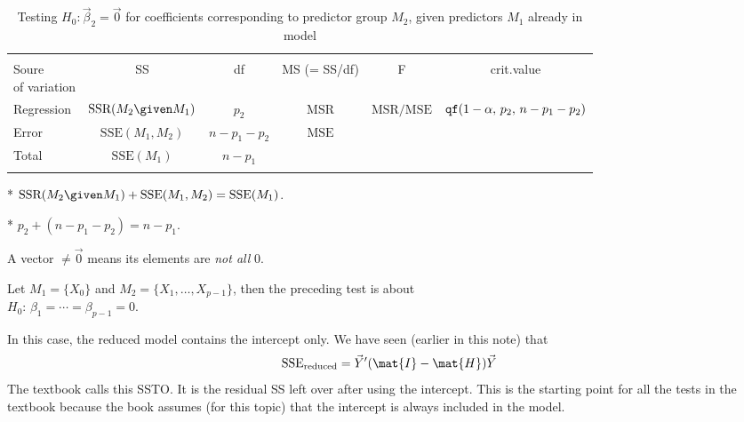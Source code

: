\documentclass[12pt]{article}
\newcommand\SSE{\text{SSE}}
\newcommand\SSR{\text{SSR}}
\newcommand\MSE{\text{MSE}}
\newcommand\MSR{\text{MSR}}
\begin{document}
\begin{table}
\caption{Testing $H_0: \vec{\beta}_2 = \vec{0}$
for coefficients corresponding to predictor group $M_2$,
given predictors $M_1$ already in model}
\label{tab:anova-general}
\vskip5pt
\footnotesize
\begin{tabular}{lccccc}
\hline\\[-4pt]
\shortstack[l]{Soure\\ of variation}
    & SS & df & MS (= SS/df) & F & crit.\@ value\\
        \tabvskip{2pt} \hline \tabvskip{2pt}
Regression
    & $\SSR(M_2 \given M_1)$
        & $p_2$
            & $\MSR$
                & $\MSR / \MSE$
                    & $\text{\tt qf}(1 - \alpha,\, p_2,\, n - p_1 - p_2)$\\
Error
    & $\SSE(M_1, M_2)$
        & $n - p_1 - p_2$
            & $\MSE$ & \\
Total
    & $\SSE(M_1)$
        & $n - p_1$
             & & &\\
\tabvskip{2pt}\hline
\end{tabular}
\vskip5pt
\hspace*{2mm}
* $\SSR(M_2 \given M_1) + \SSE(M_1, M_2) = \SSE(M_1)$.
\par
\hspace*{2mm}
* $p_2 + (n - p_1 - p_2) = n - p_1$.
\end{table}


\alert
A vector $\ne \vec{0}$ means its elements are \emph{not all} 0.

\example
Let $M_1 = \{X_0\}$ and $M_2 = \{X_1,\dotsc, X_{p-1}\}$,
then the preceding test is about\\
$H_0$: $\beta_1 = \dotsb = \beta_{p-1} = 0$.

In this case, the reduced model contains the intercept only.
We have seen (earlier in this note) that
\[
\text{SSE}_{\text{reduced}} = \vec{Y}' (\mat{I} - \mat{H}) \vec{Y}
\]
The textbook calls this SSTO.
It is the residual SS left over after using the intercept.
This is the starting point for all the tests in the textbook
because the book assumes (for this topic) that the intercept
is always included in the model.
\end{document}
